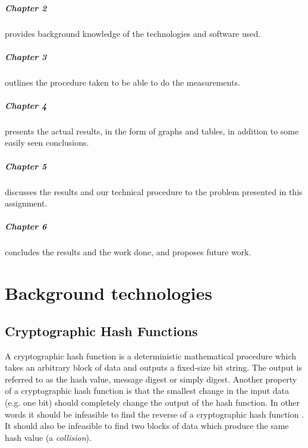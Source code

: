 \documentclass[english,12pt,a4paper]{book}
\begin{document}
\paragraph{Chapter 2} provides background knowledge of the technologies and
software used.

\paragraph{Chapter 3} outlines the procedure taken to be able to do the
measurements.

\paragraph{Chapter 4} presents the actual results, in the form of graphs and
tables, in addition to some easily seen conclusions.

\paragraph{Chapter 5} discusses the results and our technical procedure to the
problem presented in this assignment.

\paragraph{Chapter 6} concludes the results and the work done, and proposes
future work.


\chapter{Background technologies}

\section{Cryptographic Hash Functions}

A cryptographic hash function is a deterministic mathematical procedure which
takes an arbitrary block of data and outputs a fixed-size bit string. The output
is referred to as the hash value, message digest or simply digest.
Another property of a cryptographic hash function is that the smallest change in
the input data (e.g. one bit) should completely change the output of the hash
function. In other words it should be infeasible to find the reverse of a
cryptographic hash function \cite[p. 335]{stallings}. It should also be infeasible to
find two blocks of data which produce the same hash value (a \emph{collision}).
\end{document}
